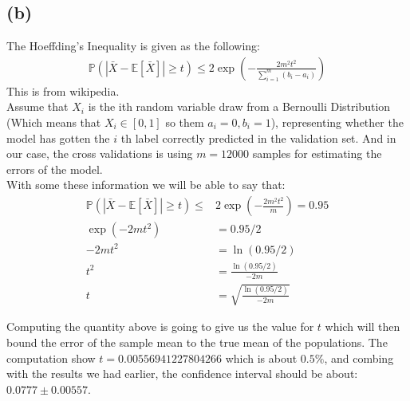 \documentclass[]{article}
\begin{document}
		\subsection*{(b)}
			The Hoeffding's Inequality is given as the following: 
			\begin{align*}\tag{B.2.1}\label{eqn:B.2.1}
				\mathbb{P}\left(
					\left|
						\bar{X} - 
						\mathbb{E}\left[\bar{X}\right]
					\right|
					\ge t
				\right)
				\le 
				2
				\exp\left(
					-\frac{2m^2t^2}{
						\sum_{i = 1}^{m}(b_i - a_i)
					}
				\right)
			\end{align*}
			This is from wikipedia.
			\\
			Assume that $X_i$ is the ith random variable draw from a Bernoulli Distribution (Which means that $X_i\in[0, 1]$ so them $a_i = 0, b_i = 1$), representing whether the model has gotten the $i$ th label correctly predicted in the validation set.  And in our case, the cross validations is using $m = 12000$ samples for estimating the errors of the model. 
			\\
			With some these information we will be able to say that: 
			\begin{align*}\tag{B.2.2}\label{eqn:B.2.2}
				\mathbb{P}\left(
					\left|
						\bar{X} - 
						\mathbb{E}\left[\bar{X}\right]
					\right|
					\ge t
				\right)
				\le& 
				2\exp\left(
					-\frac{2m^2t^2}{
						m
					}
				\right) = 0.95
				\\
				\exp
				\left(
					-2mt^2
				\right)
				&= 0.95/2
				\\
				-2mt^2 &= \ln(0.95/2)
				\\
				t^2 &= \frac{\ln(0.95/2)}{-2m}
				\\
				t &= \sqrt{\frac{\ln(0.95/2)}{-2m}}
			\end{align*}
			
	Computing the quantity above is going to give us the value for $t$ which will then bound the error of the sample mean to the true mean of the populations. The computation show $t = 0.00556941227804266$ which is about $0.5\%$, and combing with the results we had earlier, the confidence interval should be about: $0.0777 \pm 0.00557$. 
\end{document}
